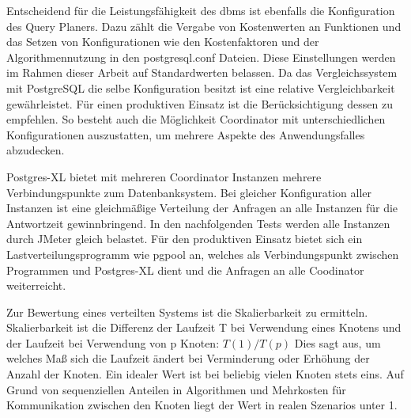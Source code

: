 Entscheidend für die Leistungsfähigkeit des \Gls{dbms} ist ebenfalls die Konfiguration des Query Planers.
Dazu zählt die Vergabe von Kostenwerten an Funktionen und das Setzen von Konfigurationen wie den Kostenfaktoren und der Algorithmennutzung in den postgresql.conf Dateien.
Diese Einstellungen werden im Rahmen dieser Arbeit auf Standardwerten belassen.
Da das Vergleichssystem mit PostgreSQL die selbe Konfiguration besitzt ist eine relative Vergleichbarkeit gewährleistet.
Für einen produktiven Einsatz ist die Berücksichtigung dessen zu empfehlen.
So besteht auch die Möglichkeit Coordinator mit unterschiedlichen Konfigurationen auszustatten, um mehrere Aspekte des Anwendungsfalles abzudecken.

Postgres-XL bietet mit mehreren Coordinator Instanzen mehrere Verbindungspunkte zum Datenbanksystem.
Bei gleicher Konfiguration aller Instanzen ist eine gleichmäßige Verteilung der Anfragen an alle Instanzen für die Antwortzeit gewinnbringend.
In den nachfolgenden Tests werden alle Instanzen durch JMeter gleich belastet.
Für den produktiven Einsatz bietet sich ein Lastverteilungsprogramm wie pgpool an, welches als Verbindungspunkt zwischen Programmen und Postgres-XL dient und die Anfragen an alle Coodinator weiterreicht.

Zur Bewertung eines verteilten Systems ist die Skalierbarkeit zu ermitteln.
Skalierbarkeit ist die Differenz der Laufzeit T bei Verwendung eines Knotens und der Laufzeit bei Verwendung von p Knoten:
$T(1)/T(p)$
Dies sagt aus, um welches Maß sich die Laufzeit ändert bei Verminderung oder Erhöhung der Anzahl der Knoten.
Ein idealer Wert ist bei beliebig vielen Knoten stets eins.
Auf Grund von sequenziellen Anteilen in Algorithmen und Mehrkosten für Kommunikation zwischen den Knoten liegt der Wert in realen Szenarios unter 1.


